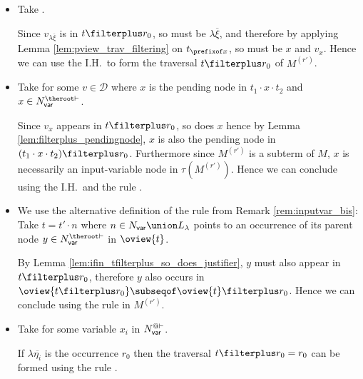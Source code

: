 \begin{itemize}
    \item {} Take .

        Since $v_{\lambda \overline{\xi}}$ is in $t
        \filterplus r_0$, so must be $\lambda \overline{\xi}$, and
        therefore by applying Lemma \ref{lem:pview_trav_filtering}
        on $t_{\prefixof x}$, so must be $x$ and $v_x$. Hence we can
        use the I.H.\ to form the traversal $t
        \filterplus r_0$ of $M^{(r')}$.


   \item {} Take  for some
    $v \in \mathcal{D}$ where $x$ is the pending node in $t_1 \cdot x \cdot t_2$ and $x \in N_{\sf var}^{\theroot\vdash}$.

    Since $v_x$ appears in $t\filterplus r_0$, so does $x$ hence by Lemma \ref{lem:filterplus_pendingnode}, $x$ is also the pending node in $(t_1 \cdot x \cdot t_2)\filterplus r_0$. Furthermore since $M^{(r')}$ is a subterm of $M$, $x$ is necessarily an input-variable node in $\tau(M^{(r')})$. Hence we can conclude using the I.H.\ and the rule .


    \item {} We use the alternative definition of the rule from Remark \ref{rem:inputvar_bis}:
    Take $t =  t' \cdot n$ where $n \in N_{\sf var}\union L_\lambda$ points to an occurrence of its parent node $y \in N_{\sf var}^{\theroot\vdash}$ in $\oview{t}$.

    By Lemma \ref{lem:ifin_tfilterplus_so_does_justifier}, $y$ must also appear in $t\filterplus r_0$,
    therefore $y$ also occurs in $\oview{t\filterplus r_0} \subseqof \oview{t}\filterplus r_0$.
    Hence we can conclude using the rule  in $M^{(r')}$.


    \item {}
    Take  for some
        variable $x_i$ in $N_{\sf var}^{@\vdash}$.

    If $\lambda \overline{\eta_i}$ is the occurrence $r_0$ then
    the traversal $t\filterplus r_0 = r_0$ can be formed using
    the rule .


\end{itemize}
